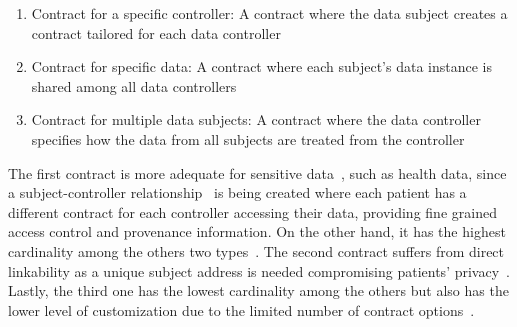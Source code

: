 \begin{enumerate}
  \item Contract for a specific controller: A contract where the data subject creates a contract tailored for each data controller
  \item Contract for specific data: A contract where each subject’s data instance is shared among all data controllers
  \item Contract for multiple data subjects: A contract where the data controller specifies how the data from all subjects are treated from the controller
\end{enumerate}

The first contract is more adequate for sensitive data~\cite{DBLP:journals/corr/NeisseSF17}, such as health data, since a subject-controller relationship~\cite{Azaria2016} is being created where each patient has a different contract for each controller accessing their data, providing fine grained access control and provenance information. On the other hand, it has the highest cardinality among the others two types~\cite{DBLP:journals/corr/NeisseSF17}. The second contract suffers from direct linkability as a unique subject address is needed compromising patients’ privacy~\cite{DBLP:journals/corr/NeisseSF17}. Lastly, the third one has the lowest cardinality among the others but also has the lower level of customization due to the limited number of contract options~\cite{DBLP:journals/corr/NeisseSF17}.
